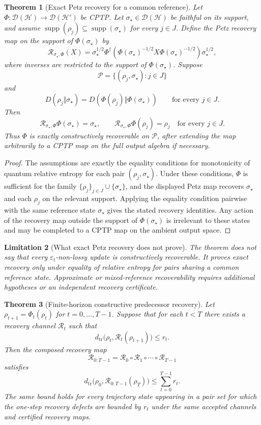 \documentclass[11pt]{article}
\newtheorem{theorem}{Theorem}[section]
\newtheorem{limitation}[theorem]{Limitation}
\newcommand{\D}{\mathcal{D}}
\newcommand{\Hcal}{\mathcal{H}}
\newcommand{\Pcal}{\mathcal{P}}
\newcommand{\Rcal}{\mathcal{R}}
\newcommand{\supp}{\operatorname{supp}}
\newcommand{\1}{\mathbf{1}}
\newcommand{\eps}{\varepsilon}
\begin{document}
\begin{theorem}[Exact Petz recovery for a common reference]
\label{thm:petz_exact_common_reference}
Let \(\Phi:\D(\Hcal)\to\D(\Hcal')\) be CPTP.  Let \(\sigma_\star\in\D(\Hcal)\) be faithful on its support, and assume \(\supp(\rho_j)\subseteq\supp(\sigma_\star)\) for every \(j\in J\).  Define the Petz recovery map on the support of \(\Phi(\sigma_\star)\) by
\[
\Rcal_{\sigma_\star,\Phi}(X)
=
\sigma_\star^{1/2}
\Phi^\dagger\!\left(
\Phi(\sigma_\star)^{-1/2}
X
\Phi(\sigma_\star)^{-1/2}
\right)
\sigma_\star^{1/2},
\]
where inverses are restricted to the support of \(\Phi(\sigma_\star)\).  Suppose
\[
\Pcal=\{(\rho_j,\sigma_\star):j\in J\}
\]
and
\[
D(\rho_j\Vert\sigma_\star)
=
D(\Phi(\rho_j)\Vert\Phi(\sigma_\star))
\qquad
\text{for every }j\in J.
\]
Then
\[
\Rcal_{\sigma_\star,\Phi}\Phi(\sigma_\star)=\sigma_\star,
\qquad
\Rcal_{\sigma_\star,\Phi}\Phi(\rho_j)=\rho_j
\quad
\text{for every }j\in J.
\]
Thus \(\Phi\) is exactly constructively recoverable on \(\Pcal\), after extending the map arbitrarily to a CPTP map on the full output algebra if necessary.
\end{theorem}

\begin{proof}
The assumptions are exactly the equality conditions for monotonicity of quantum relative entropy for each pair \((\rho_j,\sigma_\star)\).  Under these conditions, \(\Phi\) is sufficient for the family \(\{\rho_j\}_{j\in J}\cup\{\sigma_\star\}\), and the displayed Petz map recovers \(\sigma_\star\) and each \(\rho_j\) on the relevant support.  Applying the equality condition pairwise with the same reference state \(\sigma_\star\) gives the stated recovery identities.  Any action of the recovery map outside the support of \(\Phi(\sigma_\star)\) is irrelevant to these states and may be completed to a CPTP map on the ambient output space.
\end{proof}

\begin{limitation}[What exact Petz recovery does not prove]
The theorem does not say that every \(\eps_t\)-non-lossy update is constructively recoverable.  It proves exact recovery only under equality of relative entropy for pairs sharing a common reference state.  Approximate or mixed-reference recoverability requires additional hypotheses or an independent recovery certificate.
\end{limitation}

\begin{theorem}[Finite-horizon constructive predecessor recovery]
\label{thm:finite_horizon_constructive_recovery}
Let \(\rho_{t+1}=\Phi_t(\rho_t)\) for \(t=0,\dots,T-1\).  Suppose that for each \(t<T\) there exists a recovery channel \(\Rcal_t\) such that
\[
d_{\mathrm{tr}}\bigl(\rho_t,\Rcal_t(\rho_{t+1})\bigr)
\le r_t.
\]
Then the composed recovery map
\[
\Rcal_{0:T-1}
=
\Rcal_0\circ\Rcal_1\circ\cdots\circ\Rcal_{T-1}
\]
satisfies
\[
d_{\mathrm{tr}}\bigl(\rho_0,
\Rcal_{0:T-1}(\rho_T)\bigr)
\le
\sum_{t=0}^{T-1}r_t.
\]
The same bound holds for every trajectory state appearing in a pair set for which the one-step recovery defects are bounded by \(r_t\) under the same accepted channels and certified recovery maps.
\end{theorem}
\end{document}

